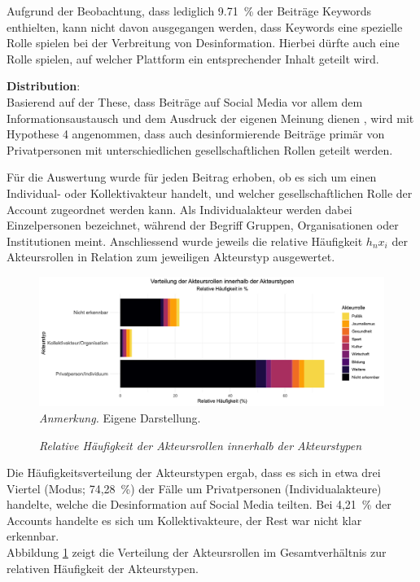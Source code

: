 \documentclass[12pt,a4paper]{article}        %
\begin{document}
Aufgrund der Beobachtung, dass lediglich 9.71 \% der Beiträge Keywords enthielten, kann nicht davon ausgegangen werden, dass Keywords eine spezielle Rolle spielen bei der Verbreitung von Desinformation. Hierbei dürfte auch eine Rolle spielen, auf welcher Plattform ein entsprechender Inhalt geteilt wird.

\textbf{Distribution}:\\
Basierend auf der These, dass Beiträge auf Social Media vor allem dem Informationsaustausch und dem Ausdruck der eigenen Meinung dienen \parencites[vgl.\ dazu][77]{lecheler_disinformation_2022}{subramanian_meet_2017}[182]{weidner_fake_2019}, wird mit Hypothese 4 angenommen, dass auch desinformierende Beiträge primär von Privatpersonen mit unterschiedlichen gesellschaftlichen Rollen geteilt werden.

Für die Auswertung wurde für jeden Beitrag erhoben, ob es sich um einen Individual- oder Kollektivakteur handelt, und welcher gesellschaftlichen Rolle der Account zugeordnet werden kann. Als Individualakteur werden dabei Einzelpersonen bezeichnet, während der Begriff  Gruppen, Organisationen oder Institutionen meint.
Anschliessend wurde jeweils die relative Häufigkeit \({h_n}{x_i}\) der Akteursrollen in Relation zum jeweiligen Akteurstyp ausgewertet.

\begin{figure}[H]
  \caption{\textit{Relative Häufigkeit der Akteursrollen innerhalb der Akteurstypen}}
  \label{fig:results_actor_plot}
  \centering
  \includegraphics[width=1\linewidth]{images/actor_plot.png}
  \footnotesize\textit{Anmerkung.} Eigene Darstellung.
\end{figure}
Die Häufigkeitsverteilung der Akteurstypen ergab, dass es sich in etwa drei Viertel (Modus; 74,28 \%) der Fälle um Privatpersonen (Individualakteure) handelte, welche die Desinformation auf Social Media teilten. Bei 4,21 \% der Accounts handelte es sich um Kollektivakteure, der Rest war nicht klar erkennbar.\\
Abbildung \ref{fig:results_actor_plot} zeigt die Verteilung der Akteursrollen im Gesamtverhältnis zur relativen Häufigkeit der Akteurstypen.
\end{document}
